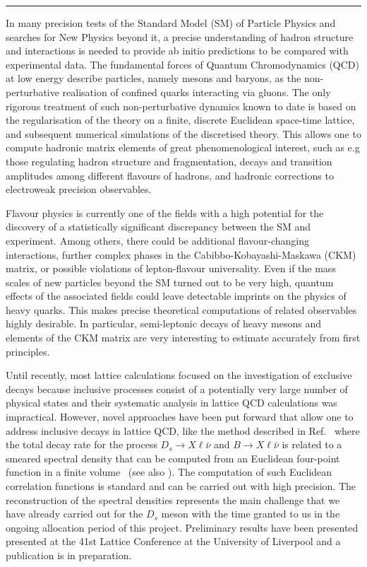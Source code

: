 \rule{\textwidth}{0.4pt}

In many precision tests of the Standard Model (SM) of Particle Physics and
searches for New Physics beyond it, a precise understanding of hadron
structure and interactions is needed to provide ab initio predictions
to be compared with experimental data. The fundamental forces of Quantum
Chromodynamics (QCD) at low energy describe particles, namely mesons and
baryons, as the non-perturbative realisation of confined quarks interacting
via gluons. The only rigorous treatment of such non-perturbative
dynamics known to date is based on the regularisation of the theory on
a finite, discrete Euclidean space-time lattice, and subsequent
numerical simulations of the discretised theory. This allows one to
compute hadronic matrix elements of great phenomenological interest,
such as e.g those regulating hadron structure and fragmentation, decays and transition
amplitudes among different flavours of hadrons, and hadronic corrections
to electroweak precision observables.

Flavour physics is currently one of the fields with a high potential
for the discovery of a statistically significant discrepancy between the SM and
experiment. Among others, there could be additional flavour-changing
interactions, further complex phases in the Cabibbo-Kobayashi-Maskawa (CKM)
matrix, or possible violations
of lepton-flavour universality. Even if the mass scales of new
particles beyond the SM turned out to be very high, quantum effects of
the associated fields could leave detectable imprints on the physics
of heavy quarks.
This makes precise theoretical computations of related observables
highly desirable. In particular, semi-leptonic decays of heavy mesons
and elements of the CKM matrix are very
interesting to estimate accurately from first principles.

Until recently, most lattice calculations focused on the investigation
of exclusive decays because inclusive processes consist
of a potentially very large number of physical states and their
systematic analysis in lattice QCD calculations was impractical.
However, novel approaches have been put forward that allow one to address
inclusive decays in lattice QCD, like the method described in
Ref.~\cite{Gambino:2020crt} where the total decay rate for the process
$D_s \to X\ell\bar\nu$ and $B \to X\ell\bar\nu$   is related to a smeared spectral
density that can be computed from an Euclidean four-point function in a finite
volume~\cite{Hansen:2019idp} (see
also \cite{Bulava:2019kbi,Bulava:2021fre,Gambino:2022dvu}). The computation of such
Euclidean correlation functions is standard and can be carried out
with high precision.
The reconstruction of the spectral densities
represents the main challenge that we have already carried out for the $D_s$ meson
with the time granted to us in the ongoing allocation period of this
project.
Preliminary results have been presented
presented at the 41st Lattice Conference at the University of Liverpool
\cite{talklatt2024_ale, talklatt2024_chr}
and a publication is in preparation.

